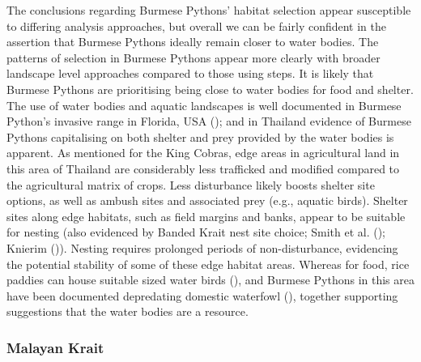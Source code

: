 \documentclass[10pt,a4paper]{article}
\begin{document}
The conclusions regarding Burmese Pythons' habitat selection appear susceptible to differing analysis approaches, but overall we can be fairly confident in the assertion that Burmese Pythons ideally remain closer to water bodies.
The patterns of selection in Burmese Pythons appear more clearly with broader landscape level approaches compared to those using steps.
It is likely that Burmese Pythons are prioritising being close to water bodies for food and shelter.
The use of water bodies and aquatic landscapes is well documented in Burmese Python's invasive range in Florida, USA (); and in Thailand evidence of Burmese Pythons capitalising on both shelter and prey provided by the water bodies is apparent.
As mentioned for the King Cobras, edge areas in agricultural land in this area of Thailand are considerably less trafficked and modified compared to the agricultural matrix of crops.
Less disturbance likely boosts shelter site options, as well as ambush sites and associated prey (e.g., aquatic birds).
Shelter sites along edge habitats, such as field margins and banks, appear to be suitable for nesting (also evidenced by Banded Krait nest site choice; Smith et al. (); Knierim ()).
Nesting requires prolonged periods of non-disturbance, evidencing the potential stability of some of these edge habitat areas.
Whereas for food, rice paddies can house suitable sized water birds (), and Burmese Pythons in this area have been documented depredating domestic waterfowl (), together supporting suggestions that the water bodies are a resource.

\subsubsection{Malayan Krait}\label{malayan-krait-1}
\end{document}
